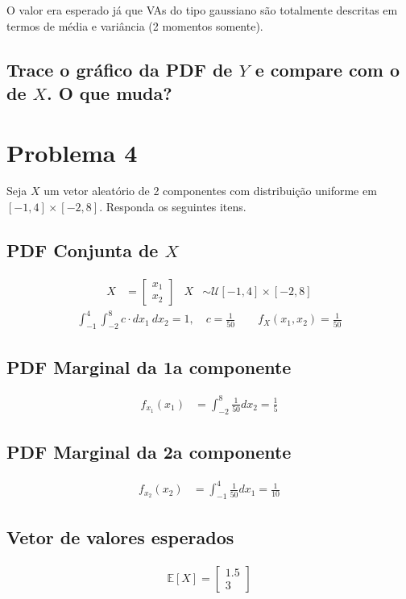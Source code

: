 \documentclass{article}
\begin{document}
O valor era esperado já que VAs do tipo gaussiano são totalmente descritas em termos de média e
variância (2 momentos somente).

\subsection{Trace o gráfico da PDF de $Y$ e compare com o de $X$. O que muda?}

\section{Problema 4}
Seja $X$ um vetor aleatório de 2 componentes com distribuição uniforme em $[-1,4]\times[-2,8]$.
Responda os seguintes itens.

\subsection{PDF Conjunta de $X$}
\begin{align*}
    X &= \begin{bmatrix} x_1\\x_2 \end{bmatrix} & X &\sim \mathcal{U}[-1,4]\times[-2,8]
\end{align*}%
\begin{align*}
    \int_{{-1}}^{{4}} {\int_{-2}^{8}c \cdot dx_1} \: d{x_2} = 1, \quad c = \frac{1}{50} \qquad
    f_X(x_1,x_2) = \frac{1}{50}
\end{align*}

\subsection{PDF Marginal da 1a componente}
\begin{align*}
    f_{x_1}(x_1) &=\int_{-2}^{8} \frac{1}{50}dx_2 = \frac{1}{5}
\end{align*}

\subsection{PDF Marginal da 2a componente}
\begin{align*}
    f_{x_2}(x_2) &=\int_{-1}^{4} \frac{1}{50}dx_1 = \frac{1}{10}
\end{align*}

\subsection{Vetor de valores esperados}
\begin{align*}
    \mathbb{E}[X] = \begin{bmatrix} 1.5\\3 \end{bmatrix}
\end{align*}
\end{document}
